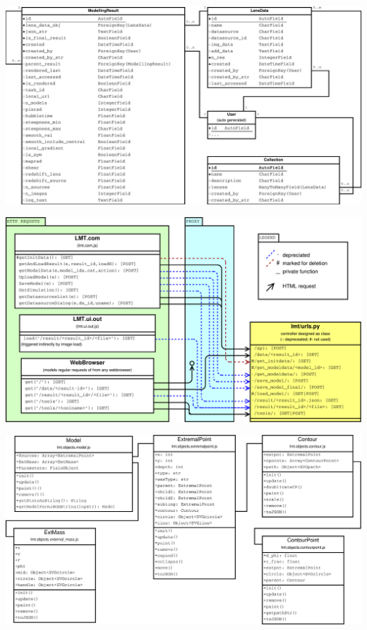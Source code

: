 \documentclass[aspectratio=1610]{beamer}
\begin{document}
\begin{frame}
  \includegraphics[width=\textwidth]{../techdoc/uml/db}
\end{frame}
\begin{frame}
  \includegraphics[width=\textwidth]{../techdoc/uml/interface_c_s}
\end{frame}
\begin{frame}
  \includegraphics[width=\textwidth]{../techdoc/uml/model}
\end{frame}
\end{document}

